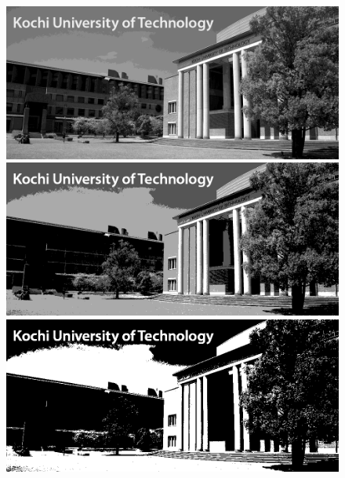 \begin{figure}[h]
\begin{minipage}[b]{.23\textwidth}
    \end{minipage}
    \begin{minipage}[b]{.23\textwidth}
        \centering
        \includegraphics[keepaspectratio,width=\textwidth]{../../Figures/05_22_4bit.png}
    \end{minipage}
    \begin{minipage}[b]{.23\textwidth}
        \centering
        \includegraphics[keepaspectratio,width=\textwidth]{../../Figures/05_23_2bit.png}
    \end{minipage}
    \begin{minipage}[b]{.23\textwidth}
        \centering
        \includegraphics[keepaspectratio,width=\textwidth]{../../Figures/05_24_1bit.png}

\end{minipage}
\end{figure}

